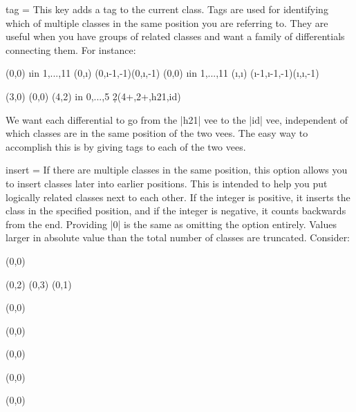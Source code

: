 \begin{sseqdata}[|| name = ex1, cohomological Serre grading]
\begin{key}{tag = }
This key adds a tag to the current class. Tags are used for identifying which of multiple classes in the same position you are referring to. They are useful when you have groups of related classes and want a family of differentials connecting them.  For instance:
\begin{codeexample}[width = 8cm]
\DeclareSseqGroup\tower {} {
    \class(0,0)
    \foreach \i in {1,...,11} {
        \class(0,\i)
        \structline(0,\i-1,-1)(0,\i,-1)
    }
}
\NewSseqGroup\hvee {} {
    \tower(0,0)
    \foreach \i in {1,...,11} {
        \class(\i,\i)
        \structline(\i-1,\i-1,-1)(\i,\i,-1)
    }
}
\begin{sseqpage}[ degree = {-1}{1}, yscale = 1.1,
                  x range = {0}{5}, y range = {0}{5} ]
\tower(3,0)
\hvee[tag = id](0,0)
\hvee[tag = h21](4,2)
\foreach \n in {0,...,5} {
    \d2(4+\n,2+\n,h21,id)
}
\end{sseqpage}
\end{codeexample}
We want each differential to go from the |h21| vee to the |id| vee, independent of which classes are in the same position of the two vees. The easy way to accomplish this is by giving tags to each of the two vees.
\end{key}

\begin{key}{insert = }
If there are multiple classes in the same position, this option allows you to insert classes later into earlier positions. This is intended to help you put logically related classes next to each other. If the integer is positive, it inserts the class in the specified position, and if the integer is negative, it counts backwards from the end. Providing |0| is the same as omitting the option entirely. Values larger in absolute value than the total number of classes are truncated.
 Consider:
\begin{codeexample}[]
\DeclareSseqGroup \tower {} {
    \class(0,0)
}

\begin{sseqdata}[name=test, y range={0}{4}, class pattern = linear]
\tower(0,2)
\tower(0,3)
\tower(0,1)
\end{sseqdata}
\qquad
\begin{sseqpage}[name=test]
\tower[red,classes={insert=1}](0,0)
\end{sseqpage}
\qquad
\begin{sseqpage}[name=test]
\tower[red,classes={insert=2}](0,0)
\end{sseqpage}
\qquad
\begin{sseqpage}[name=test]
\tower[red,classes={insert=3}](0,0)
\end{sseqpage}
\qquad
\begin{sseqpage}[name=test]
\tower[red,classes={insert=-2}](0,0)
\end{sseqpage}
\qquad
\begin{sseqpage}[name=test]
\tower[red,classes={insert=-3}](0,0)
\end{sseqpage}
\end{codeexample}


\end{key}
\end{sseqdata}
